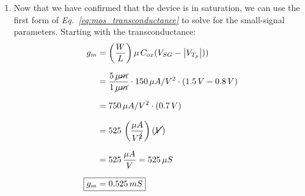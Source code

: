 \documentclass[12pt, fleqn]{article}
\begin{document}
\begin{enumerate}[label=(\alph*)]
    \item
    {
    Now that we have confirmed that the device is in saturation, we can use the first form of \textit{Eq.~\ref{eq:mos_transconductance}} to solve for the small-signal parameters.  Starting with the transconductance:
    \begin{align*}
        g_m &= \left(\frac{W}{L}\right)\mu\,C_{ox}(V_{SG} - \left|V_{T_p}\right|))\\[0.25cm]
        &= \frac{5\,\cancel{\mu m}}{1\,\cancel{\mu m}} \cdot 150\,\mu A/V^2 \cdot (1.5\,V - 0.8\,V)\\[0.25cm]
        &= 750\,\mu A/V^2 \cdot (0.7\,V)\\[0.25cm]
        &= 525\,\left(\frac{\mu A}{V^{\cancel{2}}}\right)(\cancel{V})\\[0.25cm]
        &= 525\,\frac{\mu A}{V} = 525\,\mu S\\[0.25cm]
        \Aboxed{g_m &= 0.525\,mS}
    \end{align*}
    }
    

\end{enumerate}
\end{document}
